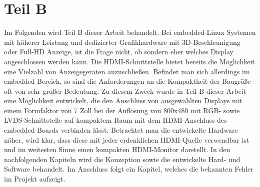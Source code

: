 \chapter{Teil B}
\label{cha:TeilB}
Im Folgenden wird Teil B dieser Arbeit behandelt. Bei embedded-Linux Systemen mit höherer Leistung und dedizierter Grafikhardware mit 3D-Beschleunigung oder Full-HD Anzeige, ist die Frage nicht, ob sondern eher welches Display angeschlossen werden kann. Die HDMI-Schnittstelle bietet bereits die Möglichkeit eine Vielzahl von Anzeigegeräten anzuschließen. Befindet man sich allerdings im embedded Bereich, so sind die Anforderungen an die Kompaktheit der Baugröße oft von sehr großer Bedeutung. Zu diesem Zweck wurde in Teil B dieser Arbeit eine Möglichkeit entwickelt, die den Anschluss von ausgewählten Displays mit einem Formfaktor von 7 Zoll bei der Auflösung von 800x480 mit RGB- sowie LVDS-Schnittstelle auf kompaktem Raum mit dem HDMI-Anschluss des embedded-Boards  verbinden lässt. Betrachtet man die entwickelte Hardware näher, wird klar, dass diese mit jeder erdenklichen HDMI-Quelle verwendbar ist und im weitesten Sinne einen kompakten HDMI-Monitor darstellt.
In den nachfolgenden Kapiteln wird die Konzeption sowie die entwickelte Hard- und Software behandelt. Im Anschluss folgt ein Kapitel, welches die bekannten Fehler im Projekt aufzeigt.\newpage




